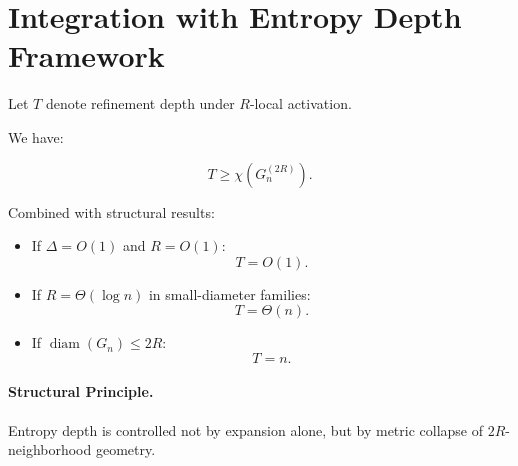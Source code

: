 \section{Integration with Entropy Depth Framework}

Let $T$ denote refinement depth under $R$-local activation.

We have:

\[
T \ge \chi(G_n^{(2R)}).
\]

Combined with structural results:

\begin{itemize}
\item If $\Delta=O(1)$ and $R=O(1)$:
\[
T = O(1).
\]

\item If $R=\Theta(\log n)$ in small-diameter families:
\[
T = \Theta(n).
\]

\item If $\operatorname{diam}(G_n) \le 2R$:
\[
T = n.
\]
\end{itemize}

\paragraph{Structural Principle.}
Entropy depth is controlled not by expansion alone,
but by metric collapse of $2R$-neighborhood geometry.
